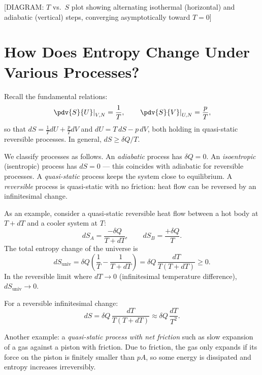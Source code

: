 \begin{center}[DIAGRAM: $T$ vs.\ $S$ plot showing alternating isothermal (horizontal) and adiabatic (vertical) steps, converging asymptotically toward $T = 0$]\end{center}

\section{How Does Entropy Change Under Various Processes?}

Recall the fundamental relations:
\begin{equation}
    \left.\pdv{S}{U}\right|_{V, N} = \frac{1}{T}, \qquad
    \left.\pdv{S}{V}\right|_{U, N} = \frac{p}{T},
\end{equation}
so that $dS = \frac{1}{T}dU + \frac{p}{T}dV$ and $dU = T\,dS - p\,dV$, both holding in quasi-static reversible processes. In general, $dS \geq \delta Q / T$.

We classify processes as follows. An \emph{adiabatic} process has $\delta Q = 0$. An \emph{isoentropic} (isentropic) process has $dS = 0$ --- this coincides with adiabatic for reversible processes. A \emph{quasi-static} process keeps the system close to equilibrium. A \emph{reversible} process is quasi-static with no friction: heat flow can be reversed by an infinitesimal change.

As an example, consider a quasi-static reversible heat flow between a hot body at $T+dT$ and a cooler system at $T$:
\begin{equation}
    dS_A = \frac{-\delta Q}{T + dT}, \qquad dS_B = \frac{+\delta Q}{T}.
\end{equation}
The total entropy change of the universe is
\begin{equation}
    dS_\text{univ} = \delta Q\!\left(\frac{1}{T} - \frac{1}{T+dT}\right) = \delta Q\,\frac{dT}{T(T+dT)} \geq 0.
\end{equation}
In the reversible limit where $dT\to 0$ (infinitesimal temperature difference), $dS_\text{univ}\to 0$.

For a reversible infinitesimal change:
\begin{equation}
    dS = \delta Q\,\frac{dT}{T(T+dT)} \approx \delta Q\,\frac{dT}{T^2}.
\end{equation}

Another example: a \emph{quasi-static process with net friction} such as slow expansion of a gas against a piston with friction. Due to friction, the gas only expands if its force on the piston is finitely smaller than $pA$, so some energy is dissipated and entropy increases irreversibly.

